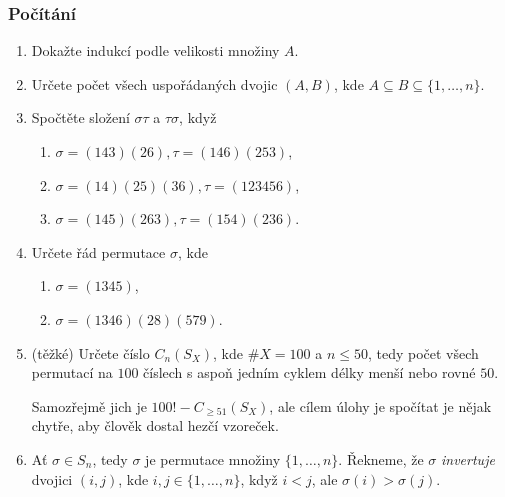 \subsubsection*{Počítání}
\begin{enumerate}
 \item  Dokažte  indukcí podle
  velikosti množiny $A$.
 \item Určete počet všech uspořádaných dvojic $(A,B)$, kde $A \subseteq B
  \subseteq \{1,\ldots,n\}$.
 \item Spočtěte složení $\sigma\tau$ a $\tau\sigma$, když
  \begin{enumerate}
   \item $\sigma = (143)(26), \tau = (146)(253)$,
   \item $\sigma = (14)(25)(36), \tau = (123456)$,
   \item $\sigma = (145)(263), \tau = (154)(236)$.
  \end{enumerate}
 \item Určete řád permutace $\sigma$, kde
  \begin{enumerate}
   \item $\sigma = (1345)$,
   \item $\sigma = (1346)(28)(579)$.
  \end{enumerate}
 \item(těžké) Určete číslo $C_n(S_X)$, kde $\# X = 100$ a $n \leq 50$, tedy
  počet všech permutací na $100$ číslech s aspoň jedním cyklem délky menší nebo
  rovné $50$.

  Samozřejmě jich je $100! - C_{ \geq 51}(S_X)$, ale cílem úlohy je spočítat je
  nějak chytře, aby člověk dostal hezčí vzoreček.
 \item Ať $\sigma \in S_n$, tedy $\sigma$ je permutace množiny $\{1,\ldots,n\}$.
  Řekneme, že $\sigma$ \emph{invertuje} dvojici $(i,j)$, kde $i,j \in
  \{1,\ldots,n\}$, když $i<j$, ale $\sigma(i)>\sigma(j)$.


\end{enumerate}
